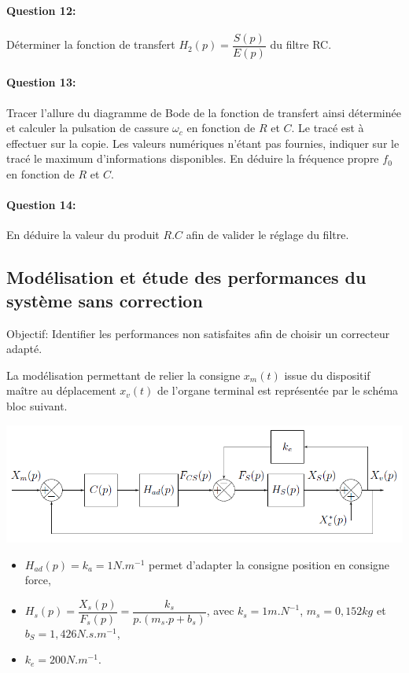 \paragraph{Question 12:} Déterminer la fonction de transfert $H_2(p)=\dfrac{S(p)}{E(p)}$ du filtre RC.

\paragraph{Question 13:} Tracer l'allure du diagramme de Bode de la fonction de transfert ainsi déterminée et calculer la pulsation de cassure $\omega_c$ en fonction de $R$ et $C$. Le tracé est à effectuer sur la copie. Les valeurs numériques n'étant pas fournies, indiquer sur le tracé le maximum d'informations disponibles. En déduire la fréquence propre $f_0$ en fonction de $R$ et $C$.

\paragraph{Question 14:} En déduire la valeur du produit $R.C$ afin de valider le réglage du filtre.

\subsection{Modélisation et étude des performances du système sans correction}

Objectif: Identifier les performances non satisfaites afin de choisir un correcteur adapté.

La modélisation permettant de relier la consigne $x_m(t)$ issue du dispositif maître au déplacement $x_v(t)$ de l'organe terminal est représentée par le schéma bloc suivant.

\begin{center}
 \includegraphics[width=0.9\linewidth]{img/Figure18}
\end{center}

\begin{itemize}
 \item $H_{ad}(p)=k_a=1N.m^{-1}$ permet d'adapter la consigne position en consigne force,
 \item $H_s(p)=\dfrac{X_s(p)}{F_s(p)}=\dfrac{k_s}{p.(m_s.p+b_s)}$, avec $k_s=1m.N^{-1}$, $m_s=0,152kg$ et $b_S=1,426N.s.m^{-1}$,
 \item $k_e=200N.m^{-1}$.
\end{itemize}

